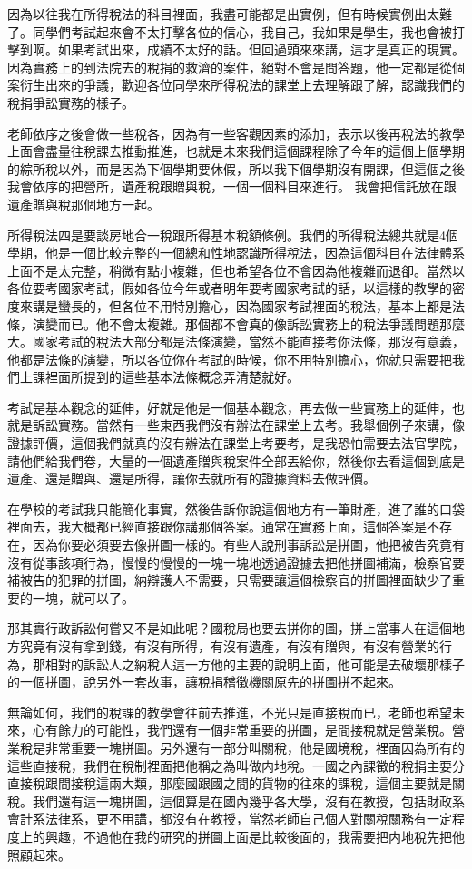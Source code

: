 \documentclass[oneside,sub3section]{ctexbook}
\begin{document}
因為以往我在所得稅法的科目裡面，我盡可能都是出實例，但有時候實例出太難了。同學們考試起來會不太打擊各位的信心，我自己，我如果是學生，我也會被打擊到啊。如果考試出來，成績不太好的話。但回過頭來來講，這才是真正的現實。因為實務上的到法院去的稅捐的救濟的案件，絕對不會是問答題，他一定都是從個案衍生出來的爭議，歡迎各位同學來所得稅法的課堂上去理解跟了解，認識我們的稅捐爭訟實務的樣子。

老師依序之後會做一些稅各，因為有一些客觀因素的添加，表示以後再稅法的教學上面會盡量往稅課去推動推進，也就是未來我們這個課程除了今年的這個上個學期的綜所稅以外，而是因為下個學期要休假，所以我下個學期沒有開課，但這個之後我會依序的把營所，遺產稅跟贈與稅，一個一個科目來進行。
我會把信託放在跟遺產贈與稅那個地方一起。

所得稅法四是要談房地合一稅跟所得基本稅額條例。我們的所得稅法總共就是4個學期，他是一個比較完整的一個總和性地認識所得稅法，因為這個科目在法律體系上面不是太完整，稍微有點小複雜，但也希望各位不會因為他複雜而退卻。當然以各位要考國家考試，假如各位今年或者明年要考國家考試的話，以這樣的教學的密度來講是蠻長的，但各位不用特別擔心，因為國家考試裡面的稅法，基本上都是法條，演變而已。他不會太複雜。那個都不會真的像訴訟實務上的稅法爭議問題那麼大。國家考試的稅法大部分都是法條演變，當然不能直接考你法條，那沒有意義，他都是法條的演變，所以各位你在考試的時候，你不用特別擔心，你就只需要把我們上課裡面所提到的這些基本法條概念弄清楚就好。

考試是基本觀念的延伸，好就是他是一個基本觀念，再去做一些實務上的延伸，也就是訴訟實務。當然有一些東西我們沒有辦法在課堂上去考。我舉個例子來講，像證據評價，這個我們就真的沒有辦法在課堂上考要考，是我恐怕需要去法官學院，請他們給我們卷，大量的一個遺產贈與稅案件全部丟給你，然後你去看這個到底是遺產、還是贈與、還是所得，讓你去就所有的證據資料去做評價。

在學校的考試我只能簡化事實，然後告訴你說這個地方有一筆財產，進了誰的口袋裡面去，我大概都已經直接跟你講那個答案。通常在實務上面，這個答案是不存在，因為你要必須要去像拼圖一樣的。有些人說刑事訴訟是拼圖，他把被告究竟有沒有從事該項行為，慢慢的慢慢的一塊一塊地透過證據去把他拼圖補滿，檢察官要補被告的犯罪的拼圖，納辯護人不需要，只需要讓這個檢察官的拼圖裡面缺少了重要的一塊，就可以了。

那其實行政訴訟何嘗又不是如此呢？國稅局也要去拼你的圖，拼上當事人在這個地方究竟有沒有拿到錢，有沒有所得，有沒有遺產，有沒有贈與，有沒有營業的行為，那相對的訴訟人之納稅人這一方他的主要的說明上面，他可能是去破壞那樣子的一個拼圖，說另外一套故事，讓稅捐稽徵機關原先的拼圖拼不起來。

無論如何，我們的稅課的教學會往前去推進，不光只是直接稅而已，老師也希望未來，心有餘力的可能性，我們還有一個非常重要的拼圖，是間接稅就是營業稅。營業稅是非常重要一塊拼圖。另外還有一部分叫關稅，他是國境稅，裡面因為所有的這些直接稅，我們在稅制裡面把他稱之為叫做内地稅。一國之內課徵的稅捐主要分直接稅跟間接稅這兩大類，那麼國跟國之間的貨物的往來的課稅，這個主要就是關稅。我們還有這一塊拼圖，這個算是在國內幾乎各大學，沒有在教授，包括財政系會計系法律系，更不用講，都沒有在教授，當然老師自己個人對關稅關務有一定程度上的興趣，不過他在我的研究的拼圖上面是比較後面的，我需要把内地稅先把他照顧起來。
\end{document}
